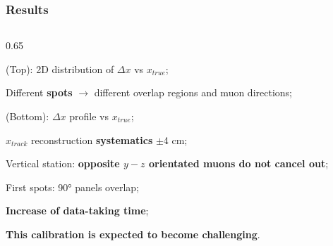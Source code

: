 \documentclass{beamer}
\begin{document}
\begin{frame}
    \frametitle{Results}

    \begin{columns}
\begin{column}{0.65\framewidth}
\vspace{-8mm}
   \setlength{\leftmargini}{1.2em}
      \begin{itemize}
 {\footnotesize
    \item (Top): 2D distribution of $\Delta x$ vs $x_{true}$;
    \vspace{3mm}
    \item Different \textbf{spots} $\rightarrow$ different overlap regions and muon directions;
    \vspace{3mm}
    \item (Bottom): $\Delta x$ profile vs $x_{true}$;
    \vspace{3mm}
    \item $x_{track}$ reconstruction \textbf{systematics} $\pm$4 cm;
    \vspace{3mm}
    \item Vertical station: \textbf{opposite $y-z$ orientated muons do not cancel out};
    \vspace{3mm}
        \item First spots: 90° panels overlap;
        \vspace{3mm}
    \item \textbf{Increase of data-taking time};
    \vspace{3mm}
\item \textbf{This calibration is expected to become challenging}. 
}


\end{itemize}
\end{column}
\end{columns}
\end{frame}
\end{document}
